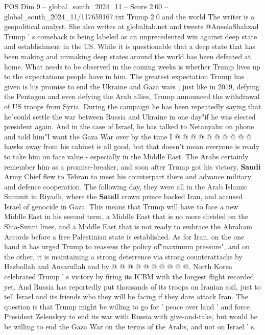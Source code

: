 \begin{textsample}{POS Dim 9 – global\_south\_2024\_11 – Score 2.00 – global\_south\_2024\_11/117659167.txt}  \label{ex:f9_pos_029}
Trump 2.0 and the world The writer is a geopolitical analyst.
She also writes at globaltab.net and tweets @AneelaShahzad Trump ' s comeback is being labeled as an unprecedented win against deep state and establishment in the US.
While it is questionable that a deep state that has been making and unmaking deep states around the world has been defeated at home.
What needs to be observed in the coming weeks is whether Trump lives up to the expectations people have in him.
The greatest expectation Trump has given is his promise to end the Ukraine and Gaza wars ; just like in 2019, defying the Pentagon and even defying the Arab allies, Trump announced the withdrawal of US troops from Syria.
During the campaign he has been repeatedly saying that he"could settle the war between Russia and Ukraine in one day"if he was elected president again.
And in the case of Israel, he has talked to Netanyahu on phone and told him"I want the Gaza War over by the time I @ @ @ @ @ @ @ @ @ @ hawks away from his cabinet is all good, but that doesn't mean everyone is ready to take him on face value - especially in the Middle East.
The Arabs certainly remember him as a promise-breaker, and soon after Trump got his victory, \textbf{Saudi} Army Chief flew to Tehran to meet his counterpart there and advance military and defence cooperation.
The following day, they were all in the Arab Islamic Summit in Riyadh, where the \textbf{Saudi} crown prince backed Iran, and accused Israel of genocide in Gaza.
This means that Trump will have to face a new Middle East in his second term, a Middle East that is no more divided on the Shia-Sunni lines, and a Middle East that is not ready to embrace the Abraham Accords before a free Palestinian state is established.
As for Iran, on the one hand it has urged Trump to reassess the policy of"maximum pressure", and on the other, it is maintaining a strong deterrence via strong counterattacks by Hezbollah and Ansarullah and by @ @ @ @ @ @ @ @ @ @.
North Korea celebrated Trump ' s victory by firing its ICBM with the longest flight recorded yet.
And Russia has reportedly put thousands of its troops on Iranian soil, just to tell Israel and its friends who they will be facing if they dare attack Iran.
The question is that Trump might be willing to go for ' peace over land ' and force President Zelenskyy to end its war with Russia with give-and-take, but would he be willing to end the Gaza War on the terms of the Arabs, and not on Israel ' s.

\end{textsample}
